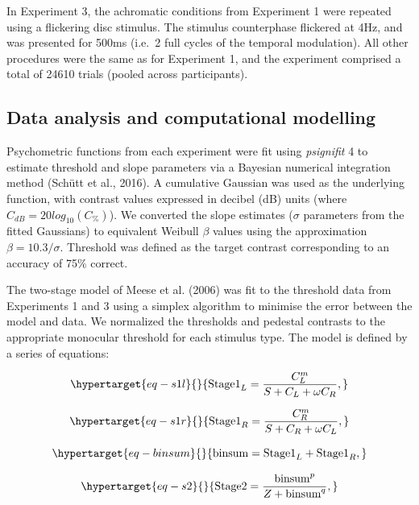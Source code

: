 \documentclass[
  letterpaper,
  DIV=11,
  numbers=noendperiod]{scrartcl}
\begin{document}
In Experiment 3, the achromatic conditions from Experiment 1 were
repeated using a flickering disc stimulus. The stimulus counterphase
flickered at 4Hz, and was presented for 500ms (i.e.~2 full cycles of the
temporal modulation). All other procedures were the same as for
Experiment 1, and the experiment comprised a total of 24610 trials
(pooled across participants).

\hypertarget{data-analysis-and-computational-modelling}{%
\subsection{Data analysis and computational
modelling}\label{data-analysis-and-computational-modelling}}

Psychometric functions from each experiment were fit using
\emph{psignifit} 4 to estimate threshold and slope parameters via a
Bayesian numerical integration method (Schütt et al., 2016). A
cumulative Gaussian was used as the underlying function, with contrast
values expressed in decibel (dB) units (where
\(C_{dB} = 20log_{10}(C_\%)\)). We converted the slope estimates
(\(\sigma\) parameters from the fitted Gaussians) to equivalent Weibull
\(\beta\) values using the approximation \(\beta = 10.3/\sigma\).
Threshold was defined as the target contrast corresponding to an
accuracy of 75\% correct.

The two-stage model of Meese et al. (2006) was fit to the threshold data
from Experiments 1 and 3 using a simplex algorithm to minimise the error
between the model and data. We normalized the thresholds and pedestal
contrasts to the appropriate monocular threshold for each stimulus type.
The model is defined by a series of equations:

\begin{equation}\protect\hypertarget{eq-s1l}{}{\mathrm{Stage1}_L = \frac{C_L^m}{S + C_L + \omega C_R},}\label{eq-s1l}\end{equation}

\begin{equation}\protect\hypertarget{eq-s1r}{}{\mathrm{Stage1}_R = \frac{C_R^m}{S + C_R + \omega C_L},}\label{eq-s1r}\end{equation}

\begin{equation}\protect\hypertarget{eq-binsum}{}{\mathrm{binsum} = \mathrm{Stage1}_L + \mathrm{Stage1}_R,}\label{eq-binsum}\end{equation}

\begin{equation}\protect\hypertarget{eq-s2}{}{\mathrm{Stage2} = \frac{\mathrm{binsum}^p}{Z + \mathrm{binsum}^q},}\label{eq-s2}\end{equation}
\end{document}
